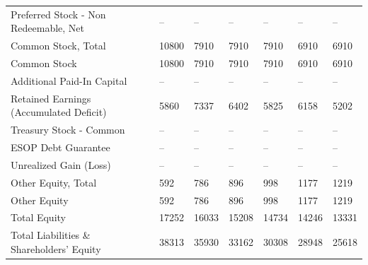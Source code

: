 \documentclass[grad,numbers]{coppe}
\begin{document}
\begin{longtable}[t]{lllllll}
  \hspace{1em}Preferred Stock - Non Redeemable, Net & -- & -- & -- & -- & -- & --\\
  \hspace{1em}Common Stock, Total & 10800 & 7910 & 7910 & 7910 & 6910 & 6910\\
  \hspace{1em}\hspace{1em}Common Stock & 10800 & 7910 & 7910 & 7910 & 6910 & 6910\\
  \hspace{1em}Additional Paid-In Capital & -- & -- & -- & -- & -- & --\\
  \hspace{1em}Retained Earnings (Accumulated Deficit) & 5860 & 7337 & 6402 & 5825 & 6158 & 5202\\
  \hspace{1em}Treasury Stock - Common & -- & -- & -- & -- & -- & --\\
  \hspace{1em}ESOP Debt Guarantee & -- & -- & -- & -- & -- & --\\
  \hspace{1em}Unrealized Gain (Loss) & -- & -- & -- & -- & -- & --\\
  \hspace{1em}Other Equity, Total & 592 & 786 & 896 & 998 & 1177 & 1219\\
  \hspace{1em}\hspace{1em}Other Equity & 592 & 786 & 896 & 998 & 1177 & 1219\\
  \hspace{1em}Total Equity & 17252 & 16033 & 15208 & 14734 & 14246 & 13331\\
  \hspace{1em}Total Liabilities \& Shareholders' Equity & 38313 & 35930 & 33162 & 30308 & 28948 & 25618\\*
  \end{longtable}
  \endgroup{}
\end{document}

